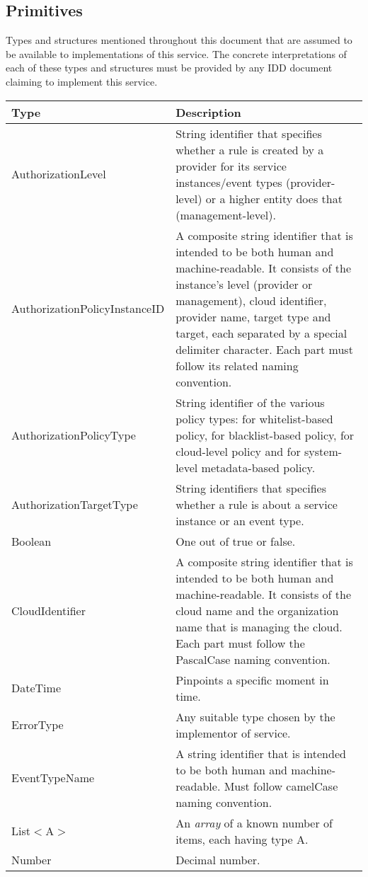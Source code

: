 \documentclass[a4paper]{arrowhead}
\newcommand{\pdef}[1]{{\textcolor{ArrowheadGrey}{#1\label{sec:model:primitives:#1}\label{sec:model:primitives:#1s}\label{sec:model:primitives:#1es}}}}
\begin{document}
\subsection{Primitives}
\label{sec:model:primitives}

Types and structures mentioned throughout this document that are assumed to be available to implementations of this service.
The concrete interpretations of each of these types and structures must be provided by any IDD document claiming to implement this service.


\begin{table}[ht!]
\begin{tabularx}{\textwidth}{| p{5cm} | X |} \hline
\rowcolor{gray!33} Type & Description \\ \hline
\pdef{AuthorizationLevel} & String identifier that specifies whether a rule is created by a provider for its service instances/event types (provider-level) or a higher entity does that (management-level). \\ \hline
\pdef{AuthorizationPolicyInstanceID} & A composite string identifier that is intended to be both human and machine-readable. It consists of the instance's level (provider or management), cloud identifier, provider name, target type and target, each separated by a special delimiter character. Each part must follow its related naming convention. \\ \hline
\pdef{AuthorizationPolicyType} & String identifier of the various policy types: for whitelist-based policy, for blacklist-based policy, for cloud-level policy and for system-level metadata-based policy. \\ \hline
\pdef{AuthorizationTargetType} & String identifiers that specifies whether a rule is about a service instance or an event type. \\ \hline
\pdef{Boolean}          & One out of true or false. \\ \hline
\pdef{CloudIdentifier} & A composite string identifier that is intended to be both human and machine-readable. It consists of the cloud name and the organization name that is managing the cloud. Each part must follow the PascalCase naming convention. \\ \hline
\pdef{DateTime}         & Pinpoints a specific moment in time. \\ \hline
\pdef{ErrorType}        & Any suitable type chosen by the implementor of service. \\ \hline
\pdef{EventTypeName}      & A string identifier that is intended to be both human and machine-readable. Must follow camelCase naming convention. \\ \hline
\pdef{List}$<$A$>$      & An \textit{array} of a known number of items, each having type A. \\ \hline
\pdef{Number}           & Decimal number. \\ \hline
\end{tabularx}
\end{table}
\end{document}
